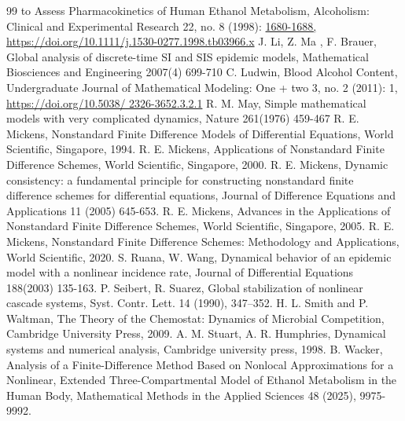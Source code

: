 \documentclass[12pt]{article}
\theoremstyle{definition}
\theoremstyle{remark}
\numberwithin{equation}{section}
\begin{document}
\begin{thebibliography}{99}
to Assess Pharmacokinetics of Human Ethanol Metabolism, Alcoholism: Clinical and Experimental Research 22, no. 8 (1998): \url{1680-1688,
https://doi.org/10.1111/j.1530-0277.1998.tb03966.x}
J. Li, Z. Ma , F. Brauer, Global analysis of discrete-time SI and SIS
epidemic models, Mathematical Biosciences and Engineering 2007(4)
699-710
C. Ludwin, Blood Alcohol Content, Undergraduate Journal of Mathematical Modeling: One + two 3, no. 2 (2011): 1, \url{https://doi.org/10.5038/
2326-3652.3.2.1}
R. M. May, Simple mathematical models with very complicated dynamics, Nature 261(1976) 459-467
R. E. Mickens,
Nonstandard Finite Difference Models of Differential Equations, 
World Scientific, Singapore, 1994.
%
%
R. E. Mickens,
Applications of Nonstandard Finite Difference Schemes,  World Scientific, Singapore, 2000.
%
%
%
R. E. Mickens, Dynamic consistency: a fundamental principle for constructing nonstandard finite difference schemes for differential equations,  Journal of Difference Equations and Applications 11 (2005) 645-653.
%
%
R. E. Mickens,  Advances in the Applications of Nonstandard Finite Difference Schemes, World Scientific, Singapore, 2005.
%
R. E. Mickens, Nonstandard Finite Difference Schemes: Methodology and Applications, World Scientific, 2020.
S. Ruana, W. Wang, Dynamical behavior of an epidemic model with a nonlinear incidence rate, Journal of Differential Equations 188(2003) 135-163.
P. Seibert, R. Suarez, 
Global stabilization of nonlinear cascade systems,  Syst. Contr. Lett. 14 (1990), 347--352.
H. L. Smith and P. Waltman,  
The Theory of the Chemostat: Dynamics of Microbial Competition,
Cambridge University Press, 2009.
A. M. Stuart, A. R.  Humphries, Dynamical systems and numerical analysis, Cambridge university press, 1998.
B. Wacker, Analysis of a Finite-Difference Method Based on Nonlocal Approximations for a Nonlinear, Extended Three-Compartmental Model of Ethanol Metabolism in the Human Body, Mathematical Methods in the Applied Sciences 48 (2025), 9975-9992.

\end{thebibliography}
\end{document}
